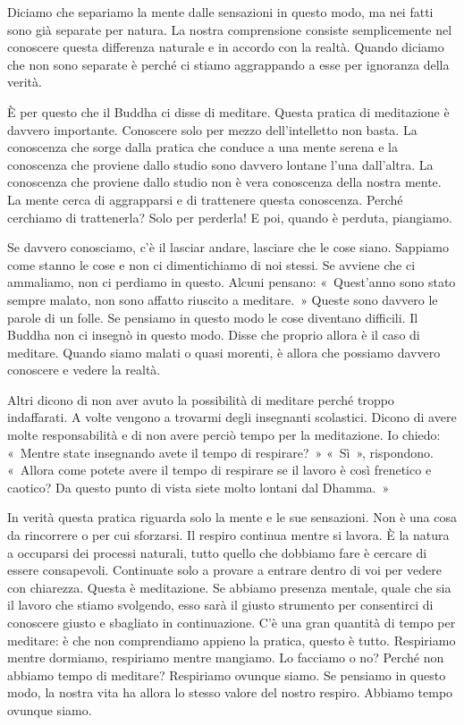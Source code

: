Diciamo che separiamo la mente dalle sensazioni in questo modo, ma nei
fatti sono già separate per natura. La nostra comprensione consiste
semplicemente nel conoscere questa differenza naturale e in accordo con
la realtà. Quando diciamo che non sono separate è perché ci stiamo
aggrappando a esse per ignoranza della verità.

È per questo che il Buddha ci disse di meditare. Questa pratica di
meditazione è davvero importante. Conoscere solo per mezzo
dell'intelletto non basta. La conoscenza che sorge dalla pratica che
conduce a una mente serena e la conoscenza che proviene dallo studio
sono davvero lontane l'una dall'altra. La conoscenza che proviene dallo
studio non è vera conoscenza della nostra mente. La mente cerca di
aggrapparsi e di trattenere questa conoscenza. Perché cerchiamo di
trattenerla? Solo per perderla! E poi, quando è perduta, piangiamo.

Se davvero conosciamo, c'è il lasciar andare, lasciare che le cose
siano. Sappiamo come stanno le cose e non ci dimentichiamo di noi
stessi. Se avviene che ci ammaliamo, non ci perdiamo in questo. Alcuni
pensano: «~Quest'anno sono stato sempre malato, non sono affatto
riuscito a meditare.~» Queste sono davvero le parole di un folle. Se
pensiamo in questo modo le cose diventano difficili. Il Buddha non ci
insegnò in questo modo. Disse che proprio allora è il caso di meditare.
Quando siamo malati o quasi morenti, è allora che possiamo davvero
conoscere e vedere la realtà.

Altri dicono di non aver avuto la possibilità di meditare perché troppo
indaffarati. A volte vengono a trovarmi degli insegnanti scolastici.
Dicono di avere molte responsabilità e di non avere perciò tempo per la
meditazione. Io chiedo: «~Mentre state insegnando avete il tempo di
respirare?~» «~Sì~», rispondono. «~Allora come potete avere il tempo di
respirare se il lavoro è così frenetico e caotico? Da questo punto di
vista siete molto lontani dal Dhamma.~»

In verità questa pratica riguarda solo la mente e le sue sensazioni. Non
è una cosa da rincorrere o per cui sforzarsi. Il respiro continua mentre
si lavora. È la natura a occuparsi dei processi naturali, tutto quello
che dobbiamo fare è cercare di essere consapevoli. Continuate solo a
provare a entrare dentro di voi per vedere con chiarezza. Questa è
meditazione. Se abbiamo presenza mentale, quale che sia il lavoro che
stiamo svolgendo, esso sarà il giusto strumento per consentirci di
conoscere giusto e sbagliato in continuazione. C'è una gran quantità di
tempo per meditare: è che non comprendiamo appieno la pratica, questo è
tutto. Respiriamo mentre dormiamo, respiriamo mentre mangiamo. Lo
facciamo o no? Perché non abbiamo tempo di meditare? Respiriamo ovunque
siamo. Se pensiamo in questo modo, la nostra vita ha allora lo stesso
valore del nostro respiro. Abbiamo tempo ovunque siamo.

